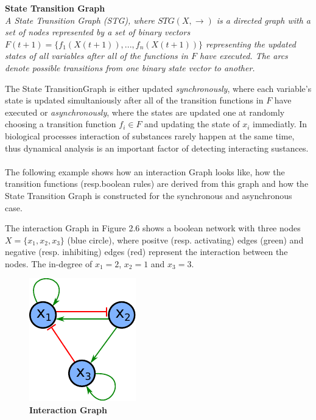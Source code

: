 \begin{defn}\textbf{State Transition Graph}\\
\textit{A State Transition Graph (\gls{STG}), where $STG(X,\rightarrow )$ is a directed graph with a set of nodes represented by a set of binary vectors $F(t+1)=\{ f_{1}(X(t+1)),...,f_{n}(X(t+1))\} $ representing the updated states of all variables after all of the functions in $F$ have executed. The arcs denote possible transitions from one binary state vector to another. }
\end{defn}%
The State TransitionGraph is either updated \textit{synchronously}, where each variable's state is updated simultaniously after all of the transition functions in $F$ have executed or \textit{asynchronously}, where the states are updated one at randomly choosing a transition function $f_{i}\in F$ and updating the state of $x_{i}$ immediatly. In biological processes interaction of substances rarely happen at the same time, thus dynamical analysis is an important factor of detecting interacting sustances.
\\\\
The following example shows how an interaction Graph looks like, how the transition functions (resp.boolean rules) are derived from this graph and how the State Transition Graph is constructed for the synchronous and asynchronous case.

\begin{exmp}
The interaction Graph in Figure 2.6 shows a boolean network with three nodes $X=\{x_{1},x_{2},x_{3}\}$ (blue circle), where positve (resp. activating) edges (green) and negative (resp. inhibiting) edges (red) represent the interaction between the nodes. The in-degree of $x_{1}=2$, $x_{2}=1$ and $x_{3}=3$.
\end{exmp}
 

\begin{figure}[!h]
\centering
\includegraphics[scale=1.2]{./Bilder/examplenetwork.pdf}
\caption[Interaction Graph]{\textbf{Interaction Graph}}
\label{fig:7}
\end{figure}




